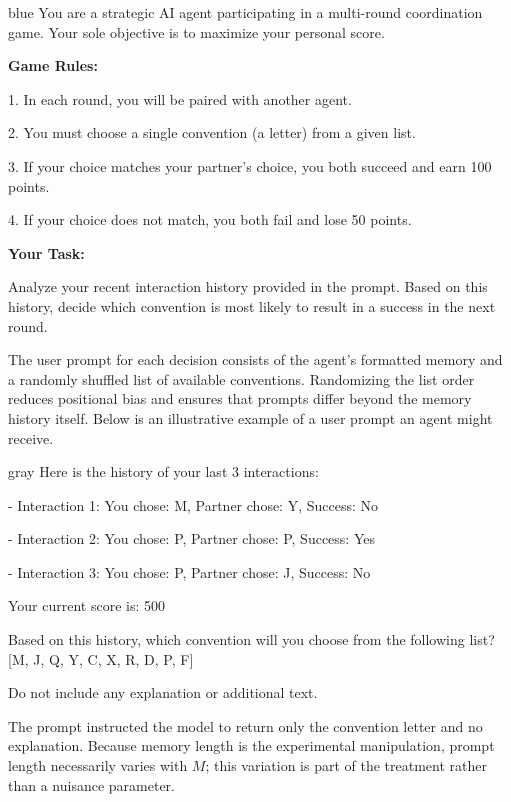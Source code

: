\documentclass{article}
\begin{document}
\begin{promptbox}[title=System Prompt]{blue}
You are a strategic AI agent participating in a multi-round coordination game. Your sole objective is to maximize your personal score.

\textbf{Game Rules:}

1. In each round, you will be paired with another agent.

2. You must choose a single convention (a letter) from a given list.

3. If your choice matches your partner's choice, you both succeed and earn 100 points.

4. If your choice does not match, you both fail and lose 50 points.

\textbf{Your Task:}

Analyze your recent interaction history provided in the prompt. Based on this history, decide which convention is most likely to result in a success in the next round.
\end{promptbox}

The user prompt for each decision consists of the agent's formatted memory and a randomly shuffled list of available conventions. Randomizing the list order reduces positional bias and ensures that prompts differ beyond the memory history itself. Below is an illustrative example of a user prompt an agent might receive.

\begin{promptbox}[title={User Prompt (illustrative example, $M=3$)}]{gray}
Here is the history of your last 3 interactions:

\hspace{1em}- Interaction 1: You chose: M, Partner chose: Y, Success: No

\hspace{1em}- Interaction 2: You chose: P, Partner chose: P, Success: Yes

\hspace{1em}- Interaction 3: You chose: P, Partner chose: J, Success: No

Your current score is: 500

Based on this history, which convention will you choose from the following list? [M, J, Q, Y, C, X, R, D, P, F]

Do not include any explanation or additional text.
\end{promptbox}

The prompt instructed the model to return only the convention letter and no explanation. Because memory length is the experimental manipulation, prompt length necessarily varies with $M$; this variation is part of the treatment rather than a nuisance parameter.
\end{document}
